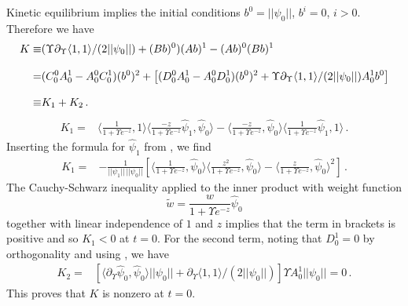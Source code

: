 Kinetic equilibrium implies the initial conditions $b^0=||\psi_0||$, $b^i=0$, $i>0$.  Therefore we have
\begin{align}
K\equiv& (\Upsilon\partial_\Upsilon \langle 1,1\rangle/(2||\psi_0||)+(Bb)^0)(Ab)^1-(Ab)^0(Bb)^1\\[0.3cm]
=&(C^0_0A^1_0-A^0_0C^1_0)(b^0)^2+\left[(D^0_0A^1_0-A^0_0D^1_0)(b^0)^2+\Upsilon\partial_\Upsilon \langle 1,1\rangle/(2||\psi_0||)A^1_0b^0\right]\notag\\[0.3cm]
\equiv & K_1+K_2\,.\notag
\end{align}
\begin{align}
K_1=&\langle \frac{1}{1+\Upsilon e^{-z}},1\rangle\langle \frac{-z}{1+\Upsilon e^{-z}}\hat\psi_1,\hat\psi_0\rangle-\langle\frac{-z}{1+\Upsilon e^{-z}},\hat\psi_0\rangle\langle\frac{1}{1+ \Upsilon e^{-z}}\hat\psi_1,1\rangle\,.
\end{align}
Inserting the formula for $\hat\psi_1$ from , we find
\begin{align}
K_1=&-\frac{1}{||\psi_1||\,||\psi_0||}\left[\langle\frac{1}{1+ \Upsilon e^{-z}},\hat\psi_0\rangle\langle\frac{z^2}{1+\Upsilon e^{-z}},\hat\psi_0\rangle-\langle\frac{z}{1+\Upsilon e^{-z}},\hat\psi_0\rangle^2\right]\,.
\end{align}
The Cauchy-Schwarz inequality  applied to the inner product with weight function
\begin{equation}
\tilde{w}=\frac{w}{1+\Upsilon e^{-z}}\hat\psi_0
\end{equation}
together with linear independence of $1$ and $z$ implies that the term in brackets is positive and so $K_1<0$ at $t=0$.  For the second term, noting that $D^1_0=0$ by orthogonality and using , we have
\begin{align}
K_2=&[\langle\partial_\Upsilon\hat\psi_0,\hat\psi_0\rangle||\psi_0||+\partial_\Upsilon \langle 1,1\rangle/(2||\psi_0||)]\Upsilon A_0^1||\psi_0||=0\,.
\end{align}
This proves that $K$ is nonzero at $t=0$.\\

